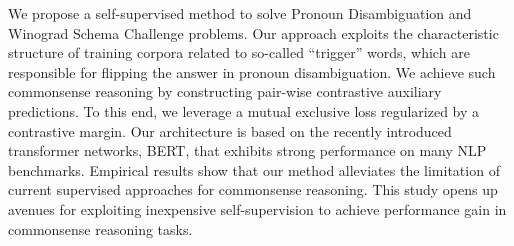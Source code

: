 We propose a self-supervised method to solve Pronoun Disambiguation and Winograd Schema Challenge problems. Our approach exploits the characteristic structure of training corpora related to so-called ``trigger'' words, which are responsible for flipping the answer in pronoun disambiguation. We achieve such commonsense reasoning by constructing pair-wise contrastive auxiliary predictions. To this end, we leverage a mutual exclusive loss regularized by a contrastive margin. Our architecture is based on the recently introduced transformer networks, BERT, that exhibits strong performance on many NLP benchmarks. Empirical results show that our method alleviates the limitation of current supervised approaches for commonsense reasoning. This study opens up avenues for exploiting inexpensive self-supervision to achieve performance gain in commonsense reasoning tasks.
